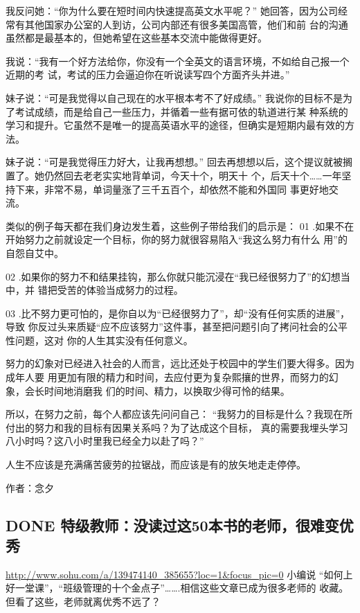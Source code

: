 \documentclass[11pt]{ctexart}
\begin{document}
{{{{我反问她：“你为什么要在短时间内快速提高英文水平呢？”
她回答，因为公司经常有其他国家办公室的人到访，公司内部还有很多美国高管，他们和前
台的沟通虽然都是最基本的，但她希望在这些基本交流中能做得更好。

我说：“我有一个好方法给你，你没有一个全英文的语言环境，不如给自己报一个近期的考
试，考试的压力会逼迫你在听说读写四个方面齐头并进。”

妹子说：“可是我觉得以自己现在的水平根本考不了好成绩。”
我说你的目标不是为了考试成绩，而是给自己一些压力，并循着一些有据可依的轨道进行某
种系统的学习和提升。它虽然不是唯一的提高英语水平的途径，但确实是短期内最有效的方
法。

妹子说：“可是我觉得压力好大，让我再想想。”
回去再想想以后，这个提议就被搁置了。她仍然回去老老实实地背单词，今天十个，明天十
个，后天十个……一年坚持下来，非常不易，单词量涨了三千五百个，却依然不能和外国同
事更好地交流。

类似的例子每天都在我们身边发生着，这些例子带给我们的启示是：
01 .如果不在开始努力之前就设定一个目标，你的努力就很容易陷入“我这么努力有什么
用”的自怨自艾中。

02 .如果你的努力不和结果挂钩，那么你就只能沉浸在“我已经很努力了”的幻想当中，并
错把受苦的体验当成努力的过程。

03 .比不努力更可怕的，是你自以为“已经很努力了”，却“没有任何实质的进展”，导致
你反过头来质疑“应不应该努力”这件事，甚至把问题引向了拷问社会的公平性问题，这对
你的人生其实没有任何意义。

努力的幻象对已经进入社会的人而言，远比还处于校园中的学生们要大得多。因为成年人要
用更加有限的精力和时间，去应付更为复杂熙攘的世界，而努力的幻象，会长时间地消磨我
们的时间、精力，以换取少得可怜的结果。

所以，在努力之前，每个人都应该先问问自己：
“我努力的目标是什么？我现在所付出的努力和我的目标有因果关系吗？为了达成这个目标，
真的需要我埋头学习八小时吗？这八小时里我已经全力以赴了吗？”

人生不应该是充满痛苦疲劳的拉锯战，而应该是有的放矢地走走停停。

作者：念夕

\subsection{{\bfseries\sffamily DONE} 特级教师：没读过这50本书的老师，很难变优秀}
\label{sec:orgceb2305}
\url{http://www.sohu.com/a/139474140\_385655?loc=1\&focus\_pic=0}
小编说
“如何上好一堂课”，“班级管理的十个金点子”\ldots{}\ldots{}.相信这些文章已成为很多老师的
收藏。但看了这些，老师就离优秀不远了？

}}}}
\end{document}
